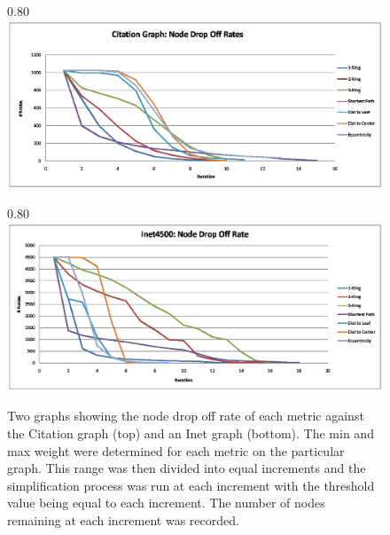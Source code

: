 \begin{figure}[htp]
\begin{center}
 \scalebox
 {0.80} %
 {
 \includegraphics{images/citation_graph_node_drop_off.eps}
 }
 
 \scalebox
 {0.80}
 {
 \includegraphics{images/inet4500_node_drop_off.eps}
 }
\end{center}
\caption{\label{fig:node_drop_off}
Two graphs showing the node drop off rate of each metric against the Citation graph \cite{Chen06} (top) and an Inet graph (bottom).  The min and max weight were determined for each metric on the particular graph.  This range was then divided into equal increments and the simplification process was run at each increment with the threshold value being equal to each increment.  The number of nodes remaining at each increment was recorded.
}
\end{figure}


